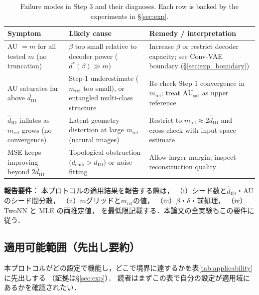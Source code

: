 \documentclass[11pt,a4paper]{jsarticle}
\newcommand{\dID}{d_{\mathrm{ID}}}
\newcommand{\hatdID}{\hat{d}_{\mathrm{ID}}}
\newcommand{\AUsat}{\mathrm{AU}_{\mathrm{sat}}}
\newcommand{\demb}{d_{\mathrm{emb}}}
\newcommand{\dstar}{d^{*}(\beta)}
\begin{document}
\begin{table}[H]
\centering
\caption{Failure modes in Step 3 and their diagnoses. Each row is backed by
the experiments in §\ref{sec:exp}.}
\label{tab:failure}
\small
\begin{tabular}{p{4.2cm}p{4.6cm}p{4.6cm}}
\toprule
Symptom & Likely cause & Remedy / interpretation \\
\midrule
AU $= m$ for all tested $m$ (no truncation) & $\beta$ too small relative to decoder power ($\dstar \gg m$) & Increase $\beta$ or restrict decoder capacity; see Conv-VAE boundary (§\ref{sec:exp_boundary}) \\
AU saturates far above $\hatdID$ & Step-1 underestimate ($m_{\mathrm{ref}}$ too small), or entangled multi-class structure & Re-check Step 1 convergence in $m_{\mathrm{ref}}$; treat $\AUsat$ as upper reference \\
$\hatdID$ inflates as $m_{\mathrm{ref}}$ grows (no convergence) & Latent geometry distortion at large $m_{\mathrm{ref}}$ (natural images) & Restrict to $m_{\mathrm{ref}} \approx 2\hatdID$ and cross-check with input-space estimate \\
MSE keeps improving beyond $2\hatdID$ & Topological obstruction ($\demb > \dID$) or noise fitting & Allow larger margin; inspect reconstruction quality \\
\bottomrule
\end{tabular}
\end{table}

\textbf{報告要件}：
本プロトコルの適用結果を報告する際は，
（i）シード数と$\hatdID$・AU のシード間分散，
（ii）$m$グリッドと$m_{\mathrm{ref}}$の値，
（iii）$\beta$・$\delta$・前処理，
（iv）TwoNN と MLE の両推定値，
を最低限記載する．本論文の全実験もこの要件に従う．

\subsection{適用可能範囲（先出し要約）}\label{sec:protocol_applicability}

本プロトコルがどの設定で機能し，どこで境界に達するかを表\ref{tab:applicability}に先出しする
（証拠は§\ref{sec:exp}）．
読者はまずこの表で自分の設定が適用域にあるかを確認されたい．
\end{document}
